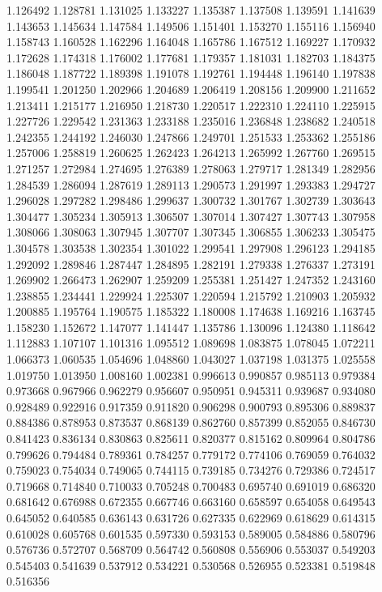1.126492
1.128781
1.131025
1.133227
1.135387
1.137508
1.139591
1.141639
1.143653
1.145634
1.147584
1.149506
1.151401
1.153270
1.155116
1.156940
1.158743
1.160528
1.162296
1.164048
1.165786
1.167512
1.169227
1.170932
1.172628
1.174318
1.176002
1.177681
1.179357
1.181031
1.182703
1.184375
1.186048
1.187722
1.189398
1.191078
1.192761
1.194448
1.196140
1.197838
1.199541
1.201250
1.202966
1.204689
1.206419
1.208156
1.209900
1.211652
1.213411
1.215177
1.216950
1.218730
1.220517
1.222310
1.224110
1.225915
1.227726
1.229542
1.231363
1.233188
1.235016
1.236848
1.238682
1.240518
1.242355
1.244192
1.246030
1.247866
1.249701
1.251533
1.253362
1.255186
1.257006
1.258819
1.260625
1.262423
1.264213
1.265992
1.267760
1.269515
1.271257
1.272984
1.274695
1.276389
1.278063
1.279717
1.281349
1.282956
1.284539
1.286094
1.287619
1.289113
1.290573
1.291997
1.293383
1.294727
1.296028
1.297282
1.298486
1.299637
1.300732
1.301767
1.302739
1.303643
1.304477
1.305234
1.305913
1.306507
1.307014
1.307427
1.307743
1.307958
1.308066
1.308063
1.307945
1.307707
1.307345
1.306855
1.306233
1.305475
1.304578
1.303538
1.302354
1.301022
1.299541
1.297908
1.296123
1.294185
1.292092
1.289846
1.287447
1.284895
1.282191
1.279338
1.276337
1.273191
1.269902
1.266473
1.262907
1.259209
1.255381
1.251427
1.247352
1.243160
1.238855
1.234441
1.229924
1.225307
1.220594
1.215792
1.210903
1.205932
1.200885
1.195764
1.190575
1.185322
1.180008
1.174638
1.169216
1.163745
1.158230
1.152672
1.147077
1.141447
1.135786
1.130096
1.124380
1.118642
1.112883
1.107107
1.101316
1.095512
1.089698
1.083875
1.078045
1.072211
1.066373
1.060535
1.054696
1.048860
1.043027
1.037198
1.031375
1.025558
1.019750
1.013950
1.008160
1.002381
0.996613
0.990857
0.985113
0.979384
0.973668
0.967966
0.962279
0.956607
0.950951
0.945311
0.939687
0.934080
0.928489
0.922916
0.917359
0.911820
0.906298
0.900793
0.895306
0.889837
0.884386
0.878953
0.873537
0.868139
0.862760
0.857399
0.852055
0.846730
0.841423
0.836134
0.830863
0.825611
0.820377
0.815162
0.809964
0.804786
0.799626
0.794484
0.789361
0.784257
0.779172
0.774106
0.769059
0.764032
0.759023
0.754034
0.749065
0.744115
0.739185
0.734276
0.729386
0.724517
0.719668
0.714840
0.710033
0.705248
0.700483
0.695740
0.691019
0.686320
0.681642
0.676988
0.672355
0.667746
0.663160
0.658597
0.654058
0.649543
0.645052
0.640585
0.636143
0.631726
0.627335
0.622969
0.618629
0.614315
0.610028
0.605768
0.601535
0.597330
0.593153
0.589005
0.584886
0.580796
0.576736
0.572707
0.568709
0.564742
0.560808
0.556906
0.553037
0.549203
0.545403
0.541639
0.537912
0.534221
0.530568
0.526955
0.523381
0.519848
0.516356
